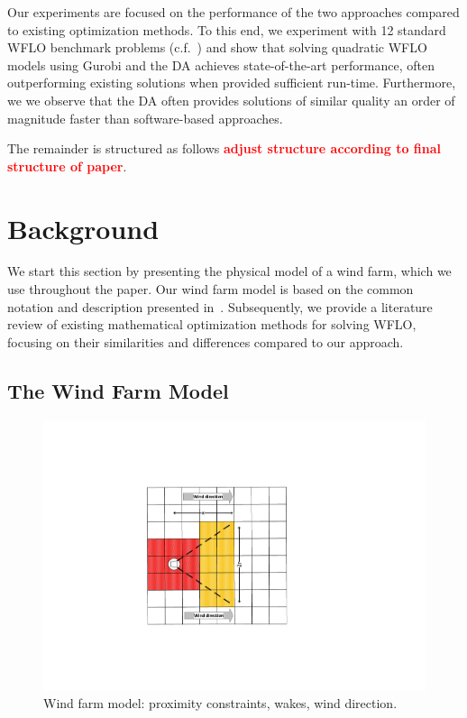 \documentclass[preprint,12pt]{elsarticle}
\newcommand{\todo}[1]{{\textcolor{red}{\bf {#1}}}}
\begin{document}
Our experiments are focused on the performance of the two approaches
compared to 
existing optimization methods. To this end,
we experiment with 12 standard WFLO benchmark problems (c.f.~\cite{turner2014new})
and show that solving quadratic WFLO models
using Gurobi and the DA
achieves state-of-the-art performance, often outperforming
existing solutions when provided sufficient run-time. Furthermore, we
we observe that the DA 
often provides solutions of similar quality an order of magnitude faster
than software-based approaches.

The remainder is structured as follows \todo{adjust structure according to final structure of paper}. 


\section{Background}
\label{sec:related}

We start this section
by presenting the
physical model 
of a wind farm, which we use throughout the paper.
Our wind farm model is based on
the common notation and description 
presented in~\cite{Zhang2014}.  
Subsequently, we provide a literature review of 
existing mathematical
optimization methods for solving WFLO, focusing
on their similarities and differences
compared to our approach.
 
\subsection{The Wind Farm Model}
\begin{figure}[t]
	\centering
	\includegraphics[scale = 0.9]{field_model.pdf}

	\caption{Wind farm model: proximity constraints, wakes, wind direction.}\label{fig:field_model}
\end{figure}
\end{document}

